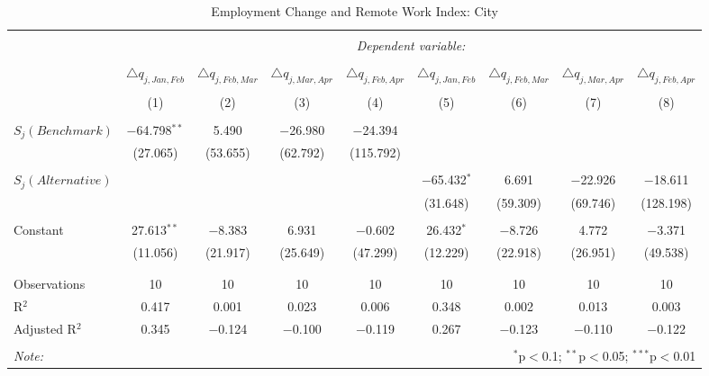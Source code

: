 
\begin{table}[!htbp] \centering 
  \caption{Employment Change and Remote Work Index: City} 
  \label{tab:regression_dynamics_city} 
\footnotesize 
\begin{tabular}{@{\extracolsep{5pt}}lcccccccc} 
\\[-1.8ex]\hline 
\hline \\[-1.8ex] 
 & \multicolumn{8}{c}{\textit{Dependent variable:}} \\ 
\cline{2-9} 
\\[-1.8ex] & $\triangle q_{j,Jan,Feb}$ & $\triangle q_{j,Feb,Mar}$ & $\triangle q_{j,Mar,Apr}$ & $\triangle q_{j,Feb,Apr}$ & $\triangle q_{j,Jan,Feb}$ & $\triangle q_{j,Feb,Mar}$ & $\triangle q_{j,Mar,Apr}$ & $\triangle q_{j,Feb,Apr}$ \\ 
\\[-1.8ex] & (1) & (2) & (3) & (4) & (5) & (6) & (7) & (8)\\ 
\hline \\[-1.8ex] 
 $S_{j}(Benchmark)$ & $-$64.798$^{**}$ & 5.490 & $-$26.980 & $-$24.394 &  &  &  &  \\ 
  & (27.065) & (53.655) & (62.792) & (115.792) &  &  &  &  \\ 
  & & & & & & & & \\ 
 $S_{j}(Alternative)$ &  &  &  &  & $-$65.432$^{*}$ & 6.691 & $-$22.926 & $-$18.611 \\ 
  &  &  &  &  & (31.648) & (59.309) & (69.746) & (128.198) \\ 
  & & & & & & & & \\ 
 Constant & 27.613$^{**}$ & $-$8.383 & 6.931 & $-$0.602 & 26.432$^{*}$ & $-$8.726 & 4.772 & $-$3.371 \\ 
  & (11.056) & (21.917) & (25.649) & (47.299) & (12.229) & (22.918) & (26.951) & (49.538) \\ 
  & & & & & & & & \\ 
\hline \\[-1.8ex] 
Observations & 10 & 10 & 10 & 10 & 10 & 10 & 10 & 10 \\ 
R$^{2}$ & 0.417 & 0.001 & 0.023 & 0.006 & 0.348 & 0.002 & 0.013 & 0.003 \\ 
Adjusted R$^{2}$ & 0.345 & $-$0.124 & $-$0.100 & $-$0.119 & 0.267 & $-$0.123 & $-$0.110 & $-$0.122 \\ 
\hline 
\hline \\[-1.8ex] 
\textit{Note:}  & \multicolumn{8}{r}{$^{*}$p$<$0.1; $^{**}$p$<$0.05; $^{***}$p$<$0.01} \\ 
\end{tabular} 
\end{table} 
